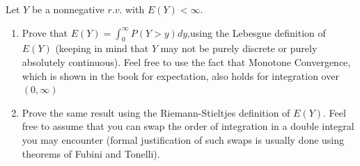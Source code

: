\documentclass[
  letterpaper,
  DIV=11,
  numbers=noendperiod]{scrreprt}
\theoremstyle{plain}
\theoremstyle{definition}
\theoremstyle{remark}
\begin{document}
Let \(Y\) be a nonnegative \(r.v.\) with \(E(Y)< \infty\).

\begin{enumerate}
\def\labelenumi{(\alph{enumi})}
\item
  Prove that \(E(Y) =\int_0^\infty P(Y > y)dy\),using the Lebesgue
  definition of \(E(Y)\) (keeping in mind that \(Y\) may not be purely
  discrete or purely absolutely continuous). Feel free to use the fact
  that Monotone Convergence, which is shown in the book for expectation,
  also holds for integration over \((0,\infty)\)
\item
  Prove the same result using the Riemann-Stieltjes definition of
  \(E(Y)\). Feel free to assume that you can swap the order of
  integration in a double integral you may encounter (formal
  justification of such swaps is usually done using theorems of Fubini
  and Tonelli).
\end{enumerate}
\end{document}
